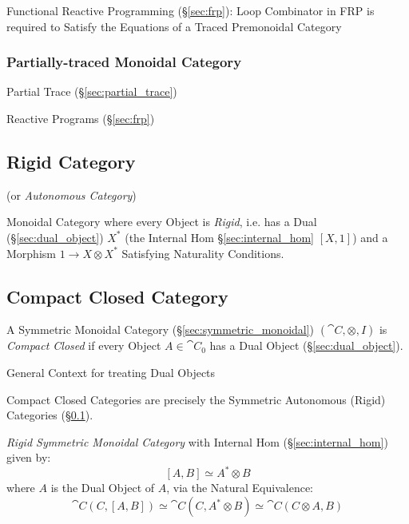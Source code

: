 Functional Reactive Programming (\S\ref{sec:frp}): Loop Combinator in
FRP is required to Satisfy the Equations of a Traced Premonoidal
Category



\subsubsection{Partially-traced Monoidal Category}
\label{sec:partially_traced}

Partial Trace (\S\ref{sec:partial_trace})

Reactive Programs (\S\ref{sec:frp})



\subsection{Rigid Category}\label{sec:rigid_category}

(or \emph{Autonomous Category})

Monoidal Category where every Object is \emph{Rigid}, i.e. has a Dual
(\S\ref{sec:dual_object}) $X^*$ (the Internal Hom
\S\ref{sec:internal_hom} $[X,1]$) and a Morphism $1 \rightarrow
X \otimes X^*$ Satisfying Naturality Conditions.



\subsection{Compact Closed Category}\label{sec:compact_closed}

A Symmetric Monoidal Category (\S\ref{sec:symmetric_monoidal})
$(\cat{C}, \otimes, I)$ is \emph{Compact Closed} if every Object
$A \in \cat{C}_0$ has a Dual Object (\S\ref{sec:dual_object}).

General Context for treating Dual Objects

Compact Closed Categories are precisely the Symmetric Autonomous (Rigid)
Categories (\S\ref{sec:rigid_category}).

\emph{Rigid Symmetric Monoidal Category} with Internal Hom
(\S\ref{sec:internal_hom}) given by:
\[
  [A,B] \simeq A^* \otimes B
\]
where $A$ is the Dual Object of $A$, via the Natural Equivalence:
\[
  \cat{C}(C,[A,B]) \simeq \cat{C}(C,A^* \otimes B)
    \simeq \cat{C}(C \otimes A, B)
\]


